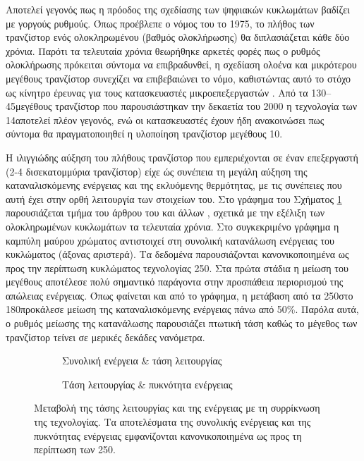 Αποτελεί γεγονός πως η πρόοδος της σχεδίασης των ψηφιακών κυκλωμάτων βαδίζει με γοργούς ρυθμούς. Όπως προέβλεπε ο νόμος του  \cite{moore2006progress} το 1975, το πλήθος των τρανζίστορ ενός ολοκληρωμένου (βαθμός ολοκλήρωσης) θα διπλασιάζεται κάθε δύο χρόνια. Παρότι τα τελευταία χρόνια θεωρήθηκε αρκετές φορές πως ο ρυθμός ολοκλήρωσης πρόκειται σύντομα να επιβραδυνθεί, η σχεδίαση ολοένα και μικρότερου μεγέθους τρανζίστορ συνεχίζει να επιβεβαιώνει το νόμο, καθιστώντας αυτό το στόχο ως κίνητρο έρευνας για τους κατασκευαστές μικροεπεξεργαστών \cite{moore2003no}. Από τα 130\nm – 45\nm μεγέθους τρανζίστορ που παρουσιάστηκαν την δεκαετία του 2000 η τεχνολογία των 14\nm αποτελεί πλέον γεγονός, ενώ οι κατασκευαστές έχουν ήδη ανακοινώσει πως σύντομα θα πραγματοποιηθεί η υλοποίηση τρανζίστορ μεγέθους 10\nm \cite{courtland2017moore}.
\par
Η ιλιγγιώδης αύξηση του πλήθους τρανζίστορ που εμπεριέχονται σε έναν επεξεργαστή (2-4 δισεκατομμύρια τρανζίστορ) είχε ώς συνέπεια τη μεγάλη αύξηση της καταναλισκόμενης ενέργειας και της εκλυόμενης θερμότητας, με τις συνέπειες που αυτή έχει στην ορθή λειτουργία των στοιχείων του. Στο γράφημα του Σχήματος \ref{fig:chap3_energy_per_tech} παρουσιάζεται τμήμα του άρθρου του  και άλλων \cite{dreslinski2010near}, σχετικά με την εξέλιξη των ολοκληρωμένων κυκλωμάτων τα τελευταία χρόνια. Στο συγκεκριμένο γράφημα η καμπύλη μαύρου χρώματος αντιστοιχεί στη συνολική κατανάλωση ενέργειας του κυκλώματος (άξονας αριστερά). Τα δεδομένα παρουσιάζονται κανονικοποιημένα ως προς την περίπτωση κυκλώματος τεχνολογίας 250\nm. Στα πρώτα στάδια η μείωση του μεγέθους αποτέλεσε πολύ σημαντικό παράγοντα στην προσπάθεια περιορισμού της απώλειας ενέργειας. Όπως φαίνεται και από το γράφημα, η μετάβαση από τα 250\nm στο 180\nm προκάλεσε μείωση της καταναλισκόμενης ενέργειας πάνω από 50\%. Παρόλα αυτά, ο ρυθμός μείωσης της κατανάλωσης παρουσιάζει πτωτική τάση καθώς το μέγεθος των τρανζίστορ τείνει σε μερικές δεκάδες νανόμετρα.

\begin{figure}[!t]
    \centering
    \begin{subfigure}[t]{0.49\textwidth}
        \centering
        \caption[Συνολική ενέργεια $\&$ τάση λειτουργίας]{Συνολική ενέργεια $\&$ τάση λειτουργίας \cite{dreslinski2010near}}
        \label{fig:chap3_energy_per_tech}
    \end{subfigure}%
    \hfill
    \begin{subfigure}[t]{0.49\textwidth}
        \centering
        \caption[Τάση λειτουργίας $\&$ πυκνότητα ενέργειας]{Τάση λειτουργίας $\&$ πυκνότητα ενέργειας \cite{pinckney2012assessing}}
        \label{fig:chap3_vdd_per_tech}
    \end{subfigure}
    \caption{Μεταβολή της τάσης λειτουργίας και της ενέργειας με τη συρρίκνωση της τεχνολογίας. Τα αποτελέσματα της συνολικής ενέργειας και της πυκνότητας ενέργειας εμφανίζονται κανονικοποιημένα ως προς τη περίπτωση των 250\nm.}
    \label{fig:chap3_Technology}
\end{figure}

